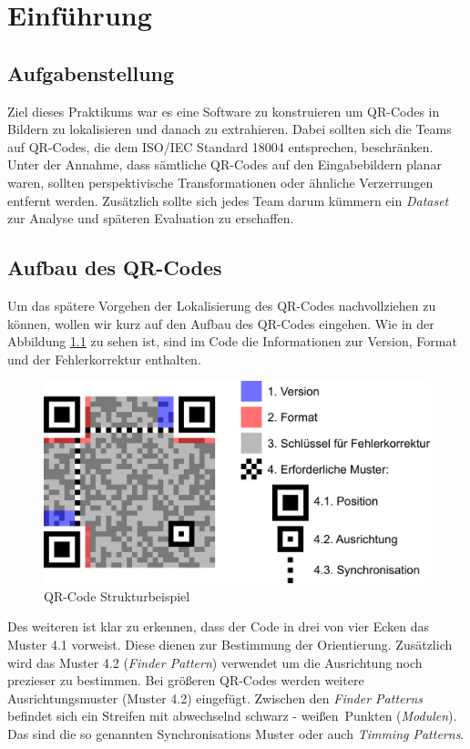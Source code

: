 \chapter{Einführung}
\section{Aufgabenstellung}
Ziel dieses Praktikums war es eine Software zu konstruieren um QR-Codes in Bildern zu lokalisieren und danach zu extrahieren.
Dabei sollten sich die Teams auf QR-Codes, die dem ISO/IEC Standard 18004 entsprechen, beschränken.
Unter der Annahme, dass sämtliche QR-Codes auf den Eingabebildern planar waren, sollten perspektivische Transformationen oder ähnliche Verzerrungen entfernt werden.
Zusätzlich sollte sich jedes Team darum kümmern ein \emph{Dataset} zur Analyse und späteren Evaluation zu erschaffen.
 
\section{Aufbau des QR-Codes}
Um das spätere Vorgehen der Lokalisierung des QR-Codes nachvollziehen zu können, wollen wir kurz auf den Aufbau des QR-Codes eingehen.
Wie in der Abbildung \ref{fig:struktur-qrcode} zu sehen ist, sind im Code die Informationen zur Version, Format und der Fehlerkorrektur enthalten. 

\begin{figure}[h]
\label{fig:struktur-qrcode}\caption{QR-Code Strukturbeispiel}
\centering
\includegraphics[scale=0.3]{images/QR_Code_Struktur_Beispiel.png}
\end{figure}

Des weiteren ist klar zu erkennen, dass der Code in drei von vier Ecken das Muster 4.1 vorweist. Diese dienen zur Bestimmung der Orientierung. Zusätzlich wird das Muster 4.2 (\emph{Finder Pattern}) verwendet um die Ausrichtung noch prezieser zu bestimmen. Bei größeren QR-Codes werden weitere Ausrichtungsmuster (Muster 4.2) eingefügt. Zwischen den \emph{Finder Patterns} befindet sich ein Streifen mit abwechselnd \glqq schwarz - weißen\grqq\  Punkten (\emph{Modulen}). Das sind die so genannten Synchronisations Muster oder auch \emph{Timming Patterns}.\\


